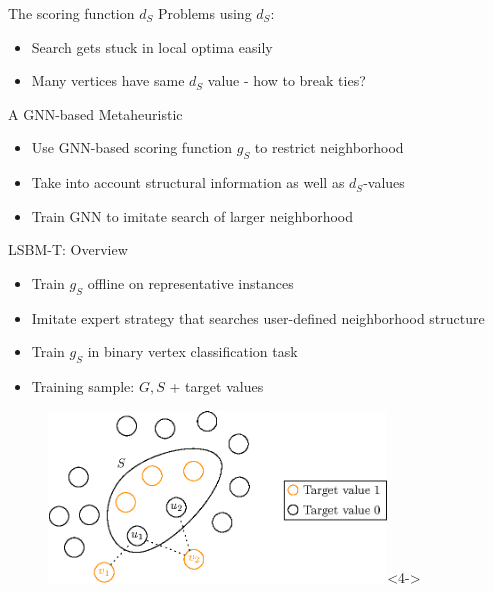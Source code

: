 \documentclass{beamer}
\begin{document}
\begin{frame}{The scoring function $d_S$}
    Problems using $d_S$:
    \begin{itemize}
        \item<1-> Search gets stuck in local optima easily
        \item<2-> Many vertices have same $d_S$ value - how to break ties?
    \end{itemize}
\end{frame}

\begin{frame}{A GNN-based Metaheuristic}
    \begin{itemize}
        \item<1-> Use GNN-based scoring function $g_S$ to restrict neighborhood
        \item<2-> Take into account structural information as well as $d_S$-values
        \item<3-> Train GNN to imitate search of larger neighborhood
    \end{itemize}
\end{frame}

\begin{frame}{LSBM-T: Overview}
    \begin{itemize}
        \item<1-> Train $g_S$ offline on representative instances
        \item<2-> Imitate expert strategy that searches user-defined neighborhood structure
        \item<3-> Train $g_S$ in binary vertex classification task
        \item<4-> Training sample: $G, S$ + target values
    \end{itemize}
    \begin{figure}
        \centering
        \includegraphics[width=0.8\textwidth]{graphics/target_values.eps}<4->
    \end{figure}
\end{frame}
\end{document}
